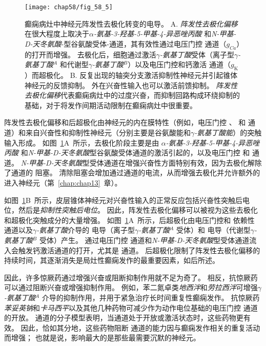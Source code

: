 \begin{figure}[htbp]
	\centering
	\texttt{[image: chap58/fig\_58\_5]}
	\caption{癫痫病灶中神经元阵发性去极化转变的电导。
		A. \textit{阵发性去极化偏移}在很大程度上取决于\textit{$\alpha$-氨基-3-羟基-5-甲基-4-异恶唑丙酸} 和\textit{N-甲基-D-天冬氨酸}-型谷氨酸受体-通道，其有效性通过电压门控  通道（$ g_{Ca} $）的打开而增强。
		去极化后，细胞通过激活\textit{$\gamma$-氨基丁酸}受体（离子型\textit{$\gamma$-氨基丁酸}$^A$ 和代谢型\textit{$\gamma$-氨基丁酸}$^B$）以及电压门控和钙激活  通道（$ g_\text{K} $）而超极化\cite{lothman1993neurobiology}。
		B. 反复出现的轴突分支激活抑制性神经元并引起锥体神经元的反馈抑制。
		外在兴奋性输入也可以激活前馈抑制。
		\textit{阵发性去极化偏移}代表癫痫病灶中的过度兴奋，而抑制回路构成环绕抑制的基础，对于将发作间期活动限制在癫痫病灶中很重要。}
	\label{fig:58_5}
\end{figure}


阵发性去极化偏移和后超极化由神经元的内在膜特性（例如，电压门控 、 和  通道）和来自兴奋性和抑制性神经元（分别主要是谷氨酸能和\textit{$\gamma$-氨基丁酸能}）的突触输入形成。
如图~\ref{fig:58_5}A~所示，去极化阶段主要是由 \textit{$\alpha$-氨基-3-羟基-5-甲基-4-异恶唑丙酸} 和\textit{N-甲基-D-天冬氨酸}型谷氨酸受体通道的激活引起的，以及电压门控  和  通道。
\textit{N-甲基-D-天冬氨酸}型受体通道在增强兴奋性方面特别有效，因为去极化解除了通道的  阻塞。
清除阻塞会增加通过通道的电流，从而增强去极化并允许额外的  进入神经元（第~\ref{chap:chap13}~章）。


如图~\ref{fig:58_5}B~所示，皮层锥体神经元对兴奋性输入的正常反应包括兴奋性突触后电位，然后是\textit{抑制性突触后电位}。
因此，阵发性去极化偏移可以被视为这些去极化和超极化突触成分的大量增强。
如图~\ref{fig:58_5}A~所示，后超极化由电压门控和  依赖性  通道以及\textit{$\gamma$-氨基丁酸}介导的  电导（离子型\textit{$\gamma$-氨基丁酸}$^A$ 受体）和  电导（代谢型\textit{$\gamma$-氨基丁酸}$^B$ 受体）产生。
 通过电压门控  通道和\textit{N-甲基-D-天冬氨酸}型受体通道流入会触发钙激活通道的打开，尤其是  通道。
后超极化限制了阵发性去极化偏移的持续时间，其逐渐消失是局灶性癫痫发作的最重要因素，如后所述。


因此，许多惊厥药通过增强兴奋或阻断抑制作用就不足为奇了。
相反，抗惊厥药可以通过阻断兴奋或增强抑制作用。 例如，苯二氮卓类\textit{地西泮}和\textit{劳拉西泮}可增强\textit{$\gamma$-氨基丁酸}$^A$ 介导的抑制作用，并用于紧急治疗长时间重复性癫痫发作。
抗惊厥药\textit{苯妥英钠}和\textit{卡马西平}以及其他几种药物可减少作为动作电位基础的电压门控  通道的开放。
 通道的分子模型表明，当通道处于开放或激活状态时，这些药物更有效。
因此，恰如其分地，这些药物阻断  通道的能力因与癫痫发作相关的重复活动而增强；
也就是说，影响最大的是那些最需要沉默的神经元。



